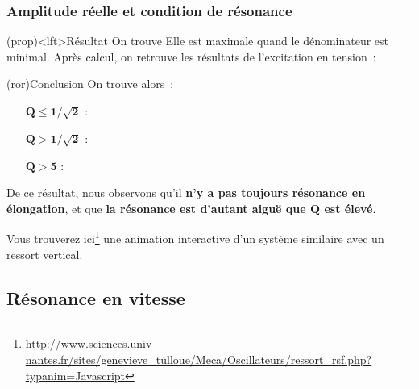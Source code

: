 \documentclass[../../main/main.tex]{subfiles}
\begin{document}
\subsubsection{Amplitude réelle et condition de résonance}
\begin{tcb}(prop)<lft>{Résultat}
	On trouve
	Elle est maximale quand le dénominateur est minimal. Après calcul, on retrouve
	les résultats de l'excitation en tension~:
\end{tcb}
\begin{tcb}(ror){Conclusion}
	On trouve alors~:
	\begin{itemize}[leftmargin=60pt]
		\item[$\mathbf{Q \leq 1/\sqrt{2}}$] :
		      \vspace{-15pt}
		\item[$\mathbf{Q > 1/\sqrt{2}}$] :
		      \vspace{-15pt}
		\item[$\mathbf{Q > 5}$] :
	\end{itemize}
	De ce résultat, nous observons qu'il \textbf{n'y a pas toujours résonance en
		élongation}, et que \textbf{la résonance est d'autant aiguë que $\mathbf{Q}$
		est élevé}.
\end{tcb}

Vous trouverez ici\footnote{\href{http://www.sciences.univ-nantes.fr/sites/genevieve\_tulloue/Meca/Oscillateurs/ressort\_rsf.php?typanim=Javascript}{http://www.sciences.univ-nantes.fr/sites/genevieve\_tulloue/Meca/Oscillateurs/ressort\_rsf.php?typanim=Javascript}} une animation interactive d'un système similaire avec un
ressort vertical.

\subsection{Résonance en vitesse}
\end{document}
